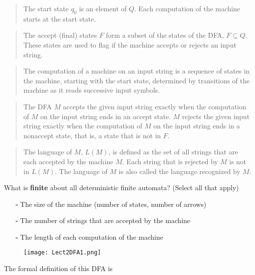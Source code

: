 \documentclass[12pt, oneside]{article}
\begin{document}
\begin{quote}
The start state $q_0$ is an element of $Q$.  Each computation of the machine starts at the  start  state.
\end{quote}

\begin{quote}
The accept (final) states $F$ form a subset of the states of the DFA, $F \subseteq  Q$. 
These states are used to flag if the machine accepts or rejects an input string.
\end{quote}


\begin{quote}
The computation of a machine on an input string is a sequence of states
in the machine,  starting with the start state, determined by transitions 
of the machine as it reads successive input symbols.
\end{quote}

\begin{quote}
The DFA $M$ accepts the given input string exactly when the computation of $M$ on the input string
ends in an accept state. $M$ rejects the given input string exactly when the computation of 
$M$ on the input string ends in a nonaccept state, that is, a state that is not in $F$.
\end{quote}

\begin{quote} 
The language of $M$, $L(M)$, is defined as the set of  all strings that are each accepted 
by the machine $M$. Each string that is rejected by $M$ is not in $L(M)$.
The language of $M$ is also called the language recognized by $M$.
\end{quote}   
   
What is {\bf finite} about all deterministic finite automata? (Select all that apply)
\begin{itemize}
   \item[$\square$] The size of the machine (number of states, number of arrows)
   \item[$\square$] The number of strings that are accepted by the machine
   \item[$\square$] The length of each computation of the machine
\end{itemize}
  
\begin{figure}[h]
   \centering
   \texttt{[image: Lect2DFA1.png]} 
\end{figure}
   
The formal definition of this DFA is
   
\end{document}

